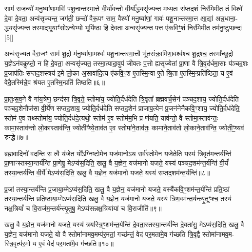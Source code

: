 साम॑ राज॒न्यो॑ मनु॒ष्या॑णा॒मविः॑ पशू॒नान्तस्मा॒त्ते वी॒र्या॑वन्तो वी॒र्या᳚द्ध्यसृ॑ज्यन्त मध्य॒तः स॑प्तद॒शं निर॑मिमीत॒ तं विश्वे॑ दे॒वा दे॒वता॒ अन्व॑सृज्यन्त॒ जग॑ती॒ छन्दो॑ वैरू॒पꣳ साम॒ वैश्यो॑ मनु॒ष्या॑णां॒ गावः॑ पशू॒नान्तस्मा॒त्त आ॒द्या॑ अन्न॒धाना॒- द्ध्यसृ॑ज्यन्त॒ तस्मा॒द्भूयाꣳ॑सो॒\-ऽन्येभ्यो॒ भूयि॑ष्ठा॒ हि दे॒वता॒ अन्वसृ॑ज्यन्त प॒त्त ए॑कवि॒ꣳ॒शं निर॑मिमीत॒ तम॑नु॒ष्टुप्छन्दः॑ [5[]

अन्व॑सृज्यत वैरा॒जꣳ साम॑ शू॒द्रो म॑नु॒ष्या॑णा॒मश्वः॑ पशू॒नान्तस्मा॒त्तौ भू॑तसंक्रा॒मिणा॒वश्व॑श्च शू॒द्रश्च॒ तस्मा᳚च्छू॒द्रो य॒ज्ञे\-ऽन॑वकॢप्तो॒ न हि दे॒वता॒ अन्वसृ॑ज्यत॒ तस्मा॒त्पादा॒वुप॑ जीवतः प॒त्तो ह्यसृ॑ज्येतां प्रा॒णा वै त्रि॒वृद॑र्धमा॒साः प॑ञ्चद॒शः प्र॒जाप॑तिः सप्तद॒शस्त्रय॑ इ॒मे लो॒का अ॒सावा॑दि॒त्य ए॑कवि॒ꣳ॒श ए॒तस्मि॒न्वा ए॒ते श्रि॒ता ए॒तस्मि॒न्प्रति॑ष्ठिता॒ य ए॒वं वेदै॒तस्मि॑न्ने॒व श्र॑यत ए॒तस्मि॒न्प्रति॑ तिष्ठति॥६॥

{\anuvakamend[{अस्थू॑रि॒रोष॑धीषु ज्येष्ठय॒ज्ञ इति॑ बृ॒हद॑नु॒ष्टुप्छन्दः॒ प्रति॑ष्ठिता॒ नव॑ च॥१॥}]}

प्रा॒तः॒स॒व॒ने वै गा॑य॒त्रेण॒ छन्द॑सा त्रि॒वृते॒ स्तोमा॑य॒ ज्योति॒र्दध॑देति त्रि॒वृता᳚ ब्रह्मवर्च॒सेन॑ पञ्चद॒शाय॒ ज्योति॒र्दध॑देति पञ्चद॒शेनौज॑सा वी॒र्ये॑ण सप्तद॒शाय॒ ज्योति॒र्दध॑देति सप्तद॒शेन॑ प्राजाप॒त्येन॑ प्र॒जन॑नेनैकवि॒ꣳ॒शाय॒ ज्योति॒र्दध॑देति॒ स्तोम॑ ए॒व तथ्स्तोमा॑य॒ ज्योति॒र्दध॑दे॒त्यथो॒ स्तोम॑ ए॒व स्तोम॑म॒भि प्र ण॑यति॒ याव॑न्तो॒ वै स्तोमा॒स्ताव॑न्तः॒ कामा॒स्ताव॑न्तो लो॒कास्ताव॑न्ति॒ ज्योतीꣳ॑ष्ये॒ताव॑त ए॒व स्तोमा॑ने॒ताव॑तः॒ कामा॑ने॒ताव॑तो लो॒काने॒ताव॑न्ति॒ ज्योती॒ꣳ॒ष्यव॑ रुन्द्धे॥७॥

{\anuvakamend[{ताव॑न्तो लो॒कास्त्रयो॑दश च॥२॥}]}

ब्र॒ह्म॒वा॒दिनो॑ वदन्ति॒ स त्वै य॑जेत॒ यो᳚\-ऽग्निष्टो॒मेन॒ यज॑मा॒नो\-ऽथ॒ सर्व॑स्तोमेन॒ यजे॒तेति॒ यस्य॑ त्रि॒वृत॑मन्त॒र्यन्ति॑ प्रा॒णाꣳस्तस्या॒न्तर्य॑न्ति प्रा॒णेषु॒ मे\-ऽप्य॑स॒दिति॒ खलु॒ वै य॒ज्ञेन॒ यज॑मानो यजते॒ यस्य॑ पञ्चद॒शम॑न्त॒र्यन्ति॑ वी॒र्यं॑ तस्या॒न्तर्य॑न्ति वी॒र्ये॑ मे\-ऽप्य॑स॒दिति॒ खलु॒ वै य॒ज्ञेन॒ यज॑मानो यजते॒ यस्य॑ सप्तद॒शम॑न्त॒र्यन्ति॑॥८॥

प्र॒जां तस्या॒न्तर्य॑न्ति प्र॒जाया॒म्मे\-ऽप्य॑स॒दिति॒ खलु॒ वै य॒ज्ञेन॒ यज॑मानो यजते॒ यस्यै॑कवि॒ꣳ॒शम॑न्त॒र्यन्ति॑ प्रति॒ष्ठां तस्या॒न्तर्य॑न्ति प्रति॒ष्ठाया॒म्मे\-ऽप्य॑स॒दिति॒ खलु॒ वै य॒ज्ञेन॒ यज॑मानो यजते॒ यस्य॑ त्रिण॒वम॑न्त॒र्यन्त्यृ॒तूꣳश्च॒ तस्य॑ नक्ष॒त्रियां᳚ च वि॒राज॑म॒न्तर्य॑न्त्यृ॒तुषु॒ मे\-ऽप्य॑सन्नक्ष॒त्रिया॑यां च वि॒राजीति॑॥९॥

खलु॒ वै य॒ज्ञेन॒ यज॑मानो यजते॒ यस्य॑ त्रयस्त्रि॒ꣳ॒शम॑न्त॒र्यन्ति॑ दे॒वता॒स्तस्या॒न्तर्य॑न्ति दे॒वता॑सु॒ मे\-ऽप्य॑स॒दिति॒ खलु॒ वै य॒ज्ञेन॒ यज॑मानो यजते॒ यो वै स्तोमा॑नामव॒मम्प॑र॒मतां॒ गच्छ॑न्तं॒ वेद॑ पर॒मता॑मे॒व ग॑च्छति त्रि॒वृद्वै स्तोमा॑नामव॒म- स्त्रि॒वृत्प॑र॒मो य ए॒वं वेद॑ पर॒मता॑मे॒व ग॑च्छति॥१०॥

